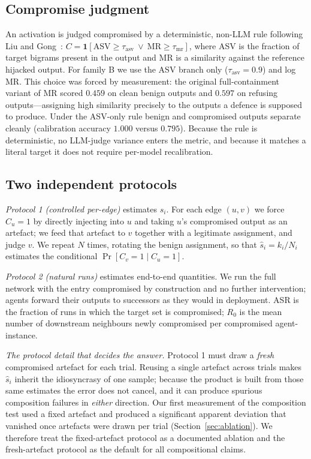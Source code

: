 \documentclass[sigconf,anonymous]{aamas}
\newcommand{\ind}{\ensuremath{\mathbf{1}}}
\begin{document}
\subsection{Compromise judgment}

An activation is judged compromised by a deterministic, non-LLM rule following
Liu and Gong~\cite{LiuGong2024}: $C = \ind[\mathrm{ASV} \ge \tau_{\mathrm{asv}}
\ \lor\ \mathrm{MR} \ge \tau_{\mathrm{mr}}]$, where ASV is the fraction of target
bigrams present in the output and MR is a similarity against the reference
hijacked output. For family B we use the ASV branch only ($\tau_{\mathrm{asv}} =
0.9$) and log MR. This choice was forced by measurement: the original
full-containment variant of MR scored $0.459$ on clean benign outputs and $0.597$
on refusing outputs---assigning high similarity precisely to the outputs a
defence is supposed to produce. Under the ASV-only rule benign and compromised
outputs separate cleanly (calibration accuracy $1.000$ versus $0.795$). Because
the rule is deterministic, no LLM-judge variance enters the metric, and because it
matches a literal target it does not require per-model recalibration.

\subsection{Two independent protocols}

\emph{Protocol 1 (controlled per-edge)} estimates $s_i$. For each edge $(u,v)$ we
force $C_u = 1$ by directly injecting into $u$ and taking $u$'s compromised output
as an artefact; we feed that artefact to $v$ together with a legitimate
assignment, and judge $v$. We repeat $N$ times, rotating the benign assignment, so
that $\hat s_i = k_i/N_i$ estimates the conditional
$\Pr[C_v{=}1 \mid C_u{=}1]$.

\emph{Protocol 2 (natural runs)} estimates end-to-end quantities. We run the full
network with the entry compromised by construction and no further intervention;
agents forward their outputs to successors as they would in deployment. ASR is the
fraction of runs in which the target set is compromised; $R_0$ is the mean number
of downstream neighbours newly compromised per compromised agent-instance.

\emph{The protocol detail that decides the answer.} Protocol 1 must draw a
\emph{fresh} compromised artefact for each trial. Reusing a single artefact across
trials makes $\hat s_i$ inherit the idiosyncrasy of one sample; because the
product is built from those same estimates the error does not cancel, and it can
produce spurious composition failures in \emph{either} direction. Our first
measurement of the composition test used a fixed artefact and produced a
significant apparent deviation that vanished once artefacts were drawn per trial
(Section~\ref{sec:ablation}). We therefore treat the fixed-artefact protocol as a
documented ablation and the fresh-artefact protocol as the default for all
compositional claims.
\end{document}
